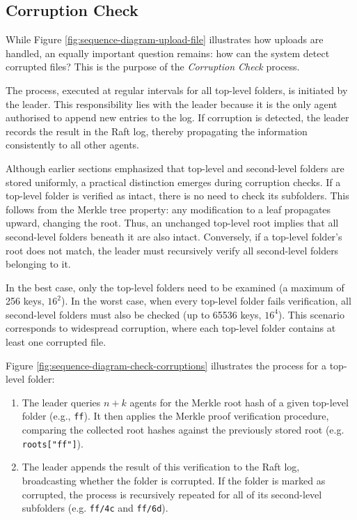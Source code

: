 \newpage
\subsection{Corruption Check} \label{sec:check-corruption}

While Figure \ref{fig:sequence-diagram-upload-file} illustrates how uploads are handled, an equally important question remains: how can the system detect corrupted files? This is the purpose of the \emph{Corruption Check} process.

The process, executed at regular intervals for all top-level folders, is initiated by the leader. This responsibility lies with the leader because it is the only agent authorised to append new entries to the log. If corruption is detected, the leader records the result in the Raft log, thereby propagating the information consistently to all other agents.

Although earlier sections emphasized that top-level and second-level folders are stored uniformly, a practical distinction emerges during corruption checks. If a top-level folder is verified as intact, there is no need to check its subfolders. This follows from the Merkle tree property: any modification to a leaf propagates upward, changing the root. Thus, an unchanged top-level root implies that all second-level folders beneath it are also intact. Conversely, if a top-level folder's root does not match, the leader must recursively verify all second-level folders belonging to it.

In the best case, only the top-level folders need to be examined (a maximum of 256 keys, $16^2$). In the worst case, when every top-level folder fails verification, all second-level folders must also be checked (up to 65536 keys, $16^4$). This scenario corresponds to widespread corruption, where each top-level folder contains at least one corrupted file.

Figure \ref{fig:sequence-diagram-check-corruptions} illustrates the process for a top-level folder:

\renewcommand{\labelenumi}{\textbf{(\theenumi)}}
\begin{enumerate}
    \item The leader queries $n+k$ agents for the Merkle root hash of a given top-level folder (e.g., \texttt{ff}). It then applies the Merkle proof verification procedure, comparing the collected root hashes against the previously stored root (e.g. \texttt{roots["ff"]}).
    \item The leader appends the result of this verification to the Raft log, broadcasting whether the folder is corrupted. If the folder is marked as corrupted, the process is recursively repeated for all of its second-level subfolders (e.g. \texttt{ff/4c} and \texttt{ff/6d}).
\end{enumerate}

